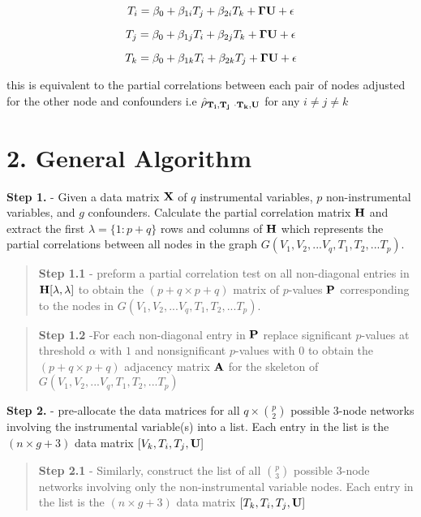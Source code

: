 \documentclass[12pt]{report}
\begin{document}
\[ T_i = \beta_0 + \beta_{1i}T_j + \beta_{2i}T_k + {\bf \Gamma U} +\epsilon \]

\[ T_j = \beta_0 + \beta_{1j}T_i + \beta_{2j}T_k + {\bf \Gamma U} +\epsilon \]

\[ T_k = \beta_0 + \beta_{1k}T_i + \beta_{2k}T_j+ {\bf \Gamma U} +\epsilon \]

this is equivalent to the partial correlations between each pair of nodes adjusted for the other node and confounders i.e  $\hat{\rho}_{\bf T_i,T_j \ \cdot T_k, {\bf U}  }$ for any $ i\neq j\neq k$ 



\section*{2. General Algorithm}

\textbf{Step 1.} - Given a data matrix ${\bf X}$ of $q$ instrumental variables, $p$ non-instrumental variables, and $g$ confounders. Calculate the partial correlation matrix $\bf H$ and extract the first $\lambda = \{1 : p+q\}$ rows and columns of ${\bf H}$ which represents the partial correlations between all nodes in the graph $G(V_1, V_2,...V_q, T_1, T_2, ... T_p)$.

\begin{quote}
\textbf{Step 1.1} - preform a partial correlation test on all non-diagonal entries in ${\bf H}[\lambda, \lambda]$ to obtain the $(p+q \times p+q)$ matrix of $p$-values ${\bf P}$ corresponding to the nodes in  $G(V_1, V_2,...V_q, T_1, T_2, ... T_p)$. 
\end{quote}

\begin{quote}
\textbf{Step 1.2} -For each non-diagonal entry in $\bf P$ replace significant $p$-values at threshold $\alpha$ with $1$ and nonsignificant $p$-values with $0$ to obtain the $(p+q \times p+q)$ adjacency matrix $\bf A$ for the skeleton of $G(V_1, V_2,...V_q, T_1, T_2, ... T_p)$
\end{quote}

\noindent \textbf{Step 2.} - pre-allocate the data matrices for all $q\times {p\choose 2}$ possible 3-node networks involving the instrumental variable(s) into a list. Each entry in the list is the $(n \times g+3)$ data matrix $[V_k, T_i, T_j, {\bf U}]$ 
\begin{quote}
\textbf{Step 2.1} - Similarly, construct the list of all $p\choose 3$ possible 3-node networks involving only the non-instrumental variable nodes. Each entry in the list is the $(n \times g+3)$ data matrix $[T_k, T_i, T_j, {\bf U}]$
\end{quote}
\end{document}
